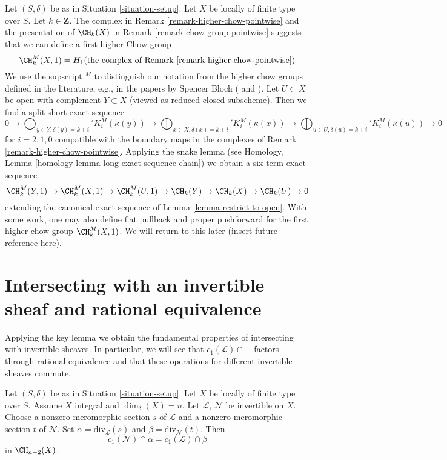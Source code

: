\begin{remark}
\label{remark-higher-chow}
Let $(S, \delta)$ be as in Situation \ref{situation-setup}.
Let $X$ be locally of finite type over $S$. Let $k \in \mathbf{Z}$.
The complex in Remark \ref{remark-higher-chow-pointwise} and the
presentation of $\CH_k(X)$ in Remark \ref{remark-chow-group-pointwise}
suggests that we can define a first higher Chow group
$$
\CH^M_k(X, 1) =
H_1(\text{the complex of Remark \ref{remark-higher-chow-pointwise}})
$$
We use the supscript ${}^M$ to distinguish our notation from the
higher chow groups defined in the literature, e.g., in the papers
by Spencer Bloch (\cite{Bloch} and \cite{Bloch-moving}).
Let $U \subset X$ be open with complement $Y \subset X$ (viewed as reduced
closed subscheme). Then we find a split short exact sequence
$$
0 \to
\bigoplus\nolimits_{y \in Y, \delta(y) = k + i}' K_i^M(\kappa(y)) \to
\bigoplus\nolimits_{x \in X, \delta(x) = k + i}' K_i^M(\kappa(x)) \to
\bigoplus\nolimits_{u \in U, \delta(u) = k + i}' K_i^M(\kappa(u)) \to 0
$$
for $i = 2, 1, 0$ compatible with the boundary maps in the complexes
of Remark \ref{remark-higher-chow-pointwise}. Applying the snake lemma
(see Homology, Lemma \ref{homology-lemma-long-exact-sequence-chain})
we obtain a six term exact sequence
$$
\CH^M_k(Y, 1) \to \CH^M_k(X, 1) \to \CH^M_k(U, 1) \to
\CH_k(Y) \to \CH_k(X) \to \CH_k(U) \to 0
$$
extending the canonical exact sequence of Lemma \ref{lemma-restrict-to-open}.
With some work, one may also define flat pullback and proper pushforward
for the first higher chow group $\CH^M_k(X, 1)$. We will return to this
later (insert future reference here).
\end{remark}






\section{Intersecting with an invertible sheaf and rational equivalence}
\label{section-commutativity}

\noindent
Applying the key lemma we obtain the fundamental properties of intersecting
with invertible sheaves. In particular, we will see that
$c_1(\mathcal{L}) \cap -$ factors through rational equivalence and
that these operations for different invertible sheaves commute.

\begin{lemma}
\label{lemma-commutativity-on-integral}
Let $(S, \delta)$ be as in Situation \ref{situation-setup}.
Let $X$ be locally of finite type over $S$.
Assume $X$ integral and $\dim_\delta(X) = n$.
Let $\mathcal{L}$, $\mathcal{N}$ be invertible on $X$.
Choose a nonzero meromorphic section $s$ of $\mathcal{L}$
and a nonzero meromorphic section $t$ of $\mathcal{N}$.
Set $\alpha = \text{div}_\mathcal{L}(s)$ and
$\beta = \text{div}_\mathcal{N}(t)$.
Then
$$
c_1(\mathcal{N}) \cap \alpha
=
c_1(\mathcal{L}) \cap \beta
$$
in $\CH_{n - 2}(X)$.
\end{lemma}

